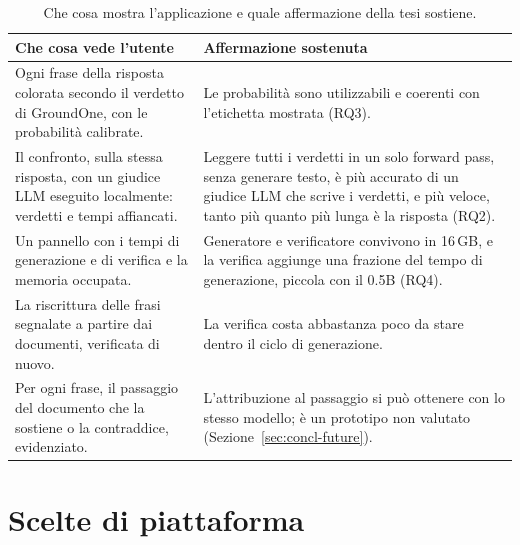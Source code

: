 \begin{table}[htbp]
\centering
\caption{Che cosa mostra l'applicazione e quale affermazione della tesi sostiene.}
\label{tab:studio-requirements}
\small
\begin{tabular}{>{\raggedright\arraybackslash}p{6.2cm}>{\raggedright\arraybackslash}p{6.8cm}}
\toprule
Che cosa vede l'utente & Affermazione sostenuta \\
\midrule
Ogni frase della risposta colorata secondo il verdetto di GroundOne, con le probabilità calibrate. & Le probabilità sono utilizzabili e coerenti con l'etichetta mostrata (RQ3). \\ \addlinespace[2pt]
Il confronto, sulla stessa risposta, con un giudice LLM eseguito localmente: verdetti e tempi affiancati. & Leggere tutti i verdetti in un solo forward pass, senza generare testo, è più accurato di un giudice LLM che scrive i verdetti, e più veloce, tanto più quanto più lunga è la risposta (RQ2). \\ \addlinespace[2pt]
Un pannello con i tempi di generazione e di verifica e la memoria occupata. & Generatore e verificatore convivono in 16\,GB, e la verifica aggiunge una frazione del tempo di generazione, piccola con il 0.5B (RQ4). \\ \addlinespace[2pt]
La riscrittura delle frasi segnalate a partire dai documenti, verificata di nuovo. & La verifica costa abbastanza poco da stare dentro il ciclo di generazione. \\ \addlinespace[2pt]
Per ogni frase, il passaggio del documento che la sostiene o la contraddice, evidenziato. & L'attribuzione al passaggio si può ottenere con lo stesso modello; è un prototipo non valutato (Sezione~\ref{sec:concl-future}). \\
\bottomrule
\end{tabular}
\end{table}

\section{Scelte di piattaforma}
\label{sec:studio-platform}

